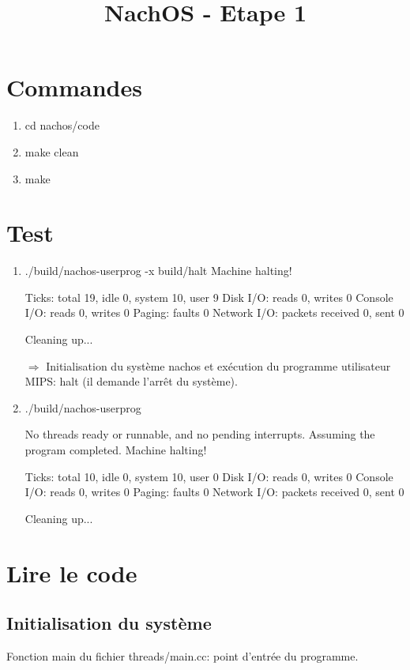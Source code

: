 \documentclass[a4paper,10pt]{article}
\title{NachOS - Etape 1}
\author{}
\date{}
\begin{document}
\maketitle


\section{Commandes}

\begin{enumerate}
 \item cd nachos/code
 \item make clean
 \item make
\end{enumerate}

\section{Test}

\begin{enumerate}
 \item ./build/nachos-userprog -x build/halt
Machine halting!

Ticks: total 19, idle 0, system 10, user 9
Disk I/O: reads 0, writes 0
Console I/O: reads 0, writes 0
Paging: faults 0
Network I/O: packets received 0, sent 0

Cleaning up...

$\Longrightarrow$ Initialisation du système nachos et exécution du 
programme utilisateur MIPS: halt (il demande l'arrêt du système).
 
 \item  ./build/nachos-userprog

No threads ready or runnable, and no pending interrupts.
Assuming the program completed.
Machine halting!

Ticks: total 10, idle 0, system 10, user 0
Disk I/O: reads 0, writes 0
Console I/O: reads 0, writes 0
Paging: faults 0
Network I/O: packets received 0, sent 0

Cleaning up...

\end{enumerate}

\section{Lire le code}

\subsection{Initialisation du système}
Fonction main du fichier threads/main.cc: point d'entrée du programme.
\end{document}
